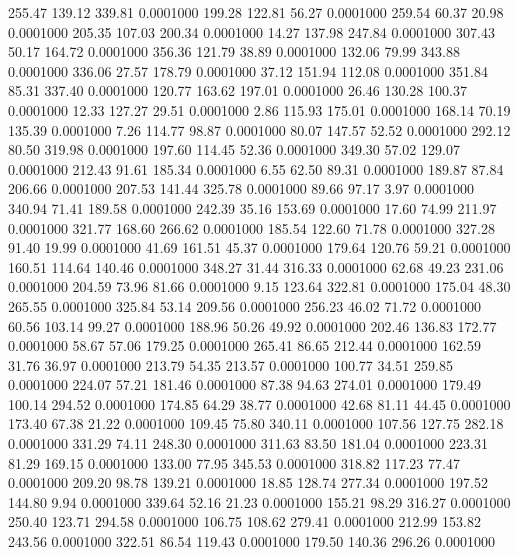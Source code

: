  255.47  139.12  339.81   0.0001000
 199.28  122.81   56.27   0.0001000
 259.54   60.37   20.98   0.0001000
 205.35  107.03  200.34   0.0001000
  14.27  137.98  247.84   0.0001000
 307.43   50.17  164.72   0.0001000
 356.36  121.79   38.89   0.0001000
 132.06   79.99  343.88   0.0001000
 336.06   27.57  178.79   0.0001000
  37.12  151.94  112.08   0.0001000
 351.84   85.31  337.40   0.0001000
 120.77  163.62  197.01   0.0001000
  26.46  130.28  100.37   0.0001000
  12.33  127.27   29.51   0.0001000
   2.86  115.93  175.01   0.0001000
 168.14   70.19  135.39   0.0001000
   7.26  114.77   98.87   0.0001000
  80.07  147.57   52.52   0.0001000
 292.12   80.50  319.98   0.0001000
 197.60  114.45   52.36   0.0001000
 349.30   57.02  129.07   0.0001000
 212.43   91.61  185.34   0.0001000
   6.55   62.50   89.31   0.0001000
 189.87   87.84  206.66   0.0001000
 207.53  141.44  325.78   0.0001000
  89.66   97.17    3.97   0.0001000
 340.94   71.41  189.58   0.0001000
 242.39   35.16  153.69   0.0001000
  17.60   74.99  211.97   0.0001000
 321.77  168.60  266.62   0.0001000
 185.54  122.60   71.78   0.0001000
 327.28   91.40   19.99   0.0001000
  41.69  161.51   45.37   0.0001000
 179.64  120.76   59.21   0.0001000
 160.51  114.64  140.46   0.0001000
 348.27   31.44  316.33   0.0001000
  62.68   49.23  231.06   0.0001000
 204.59   73.96   81.66   0.0001000
   9.15  123.64  322.81   0.0001000
 175.04   48.30  265.55   0.0001000
 325.84   53.14  209.56   0.0001000
 256.23   46.02   71.72   0.0001000
  60.56  103.14   99.27   0.0001000
 188.96   50.26   49.92   0.0001000
 202.46  136.83  172.77   0.0001000
  58.67   57.06  179.25   0.0001000
 265.41   86.65  212.44   0.0001000
 162.59   31.76   36.97   0.0001000
 213.79   54.35  213.57   0.0001000
 100.77   34.51  259.85   0.0001000
 224.07   57.21  181.46   0.0001000
  87.38   94.63  274.01   0.0001000
 179.49  100.14  294.52   0.0001000
 174.85   64.29   38.77   0.0001000
  42.68   81.11   44.45   0.0001000
 173.40   67.38   21.22   0.0001000
 109.45   75.80  340.11   0.0001000
 107.56  127.75  282.18   0.0001000
 331.29   74.11  248.30   0.0001000
 311.63   83.50  181.04   0.0001000
 223.31   81.29  169.15   0.0001000
 133.00   77.95  345.53   0.0001000
 318.82  117.23   77.47   0.0001000
 209.20   98.78  139.21   0.0001000
  18.85  128.74  277.34   0.0001000
 197.52  144.80    9.94   0.0001000
 339.64   52.16   21.23   0.0001000
 155.21   98.29  316.27   0.0001000
 250.40  123.71  294.58   0.0001000
 106.75  108.62  279.41   0.0001000
 212.99  153.82  243.56   0.0001000
 322.51   86.54  119.43   0.0001000
 179.50  140.36  296.26   0.0001000
